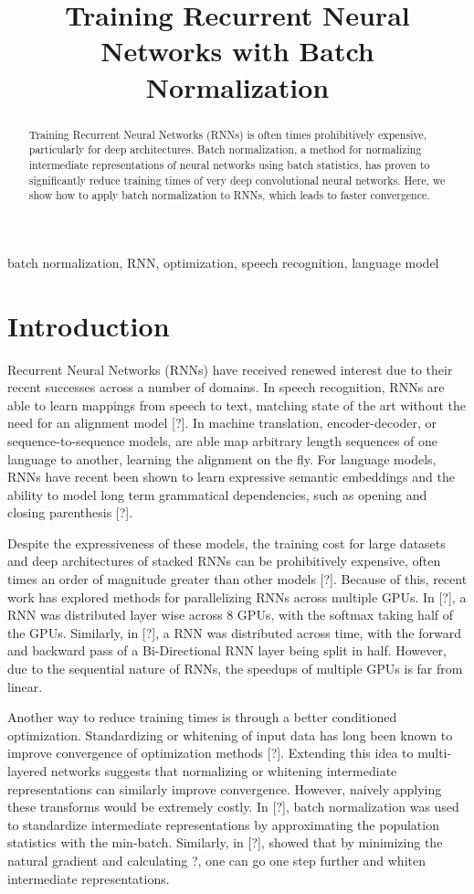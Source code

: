 \documentclass{article}
\title{Training Recurrent Neural Networks with Batch Normalization}
\begin{document}
%
\maketitle
%
\begin{abstract}
Training Recurrent Neural Networks (RNNs) is often times prohibitively expensive, particularly 
for deep architectures. Batch normalization, a method for normalizing intermediate 
representations of neural networks using batch statistics, has proven to significantly reduce 
training times of very deep convolutional neural networks. Here, we show how to apply batch
normalization to RNNs, which leads to faster convergence.

\end{abstract}
%
\begin{keywords}
batch normalization, RNN, optimization, speech recognition, language model
\end{keywords}
%
\section{Introduction}

Recurrent Neural Networks (RNNs) have received renewed interest due to their recent successes across a number of domains. In speech recognition, RNNs are able to learn mappings from speech to text, matching state of the art without the need for an alignment model [?]. In machine translation, encoder-decoder, or sequence-to-sequence models, are able map arbitrary length sequences of one language to another, learning the alignment on the fly. For language models, RNNs have recent been shown to learn expressive semantic embeddings and the ability to model long term grammatical dependencies, such as opening and closing parenthesis [?].

Despite the expressiveness of these models, the training cost for large datasets and deep architectures of stacked RNNs can be prohibitively expensive, often times an order of magnitude greater than other models [?]. Because of this, recent work has explored methods for parallelizing RNNs across multiple GPUs. In [?], a RNN was distributed layer wise across 8 GPUs, with the softmax taking half of the GPUs. Similarly, in [?], a RNN was distributed across time, with the forward and backward pass of a Bi-Directional RNN layer being split in half. However, due to the sequential nature of RNNs, the speedups of multiple GPUs is far from linear.

Another way to reduce training times is through a better conditioned optimization. Standardizing or whitening of input data has long been known to improve convergence of optimization methods [?]. Extending this idea to multi-layered networks suggests that normalizing or whitening intermediate representations can similarly improve convergence. However, naively applying these transforms would be extremely costly. In [?], batch normalization was used to standardize intermediate representations by approximating the population statistics with the min-batch. Similarly, in [?], showed that by minimizing the natural gradient and calculating ?, one can go one step further and whiten intermediate representations.
\end{document}
